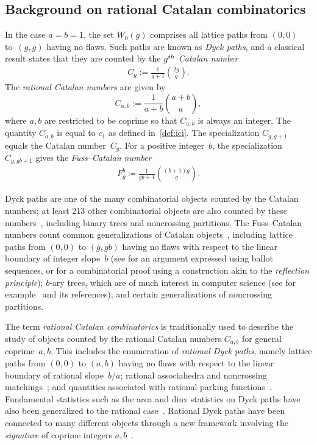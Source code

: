\documentclass[11pt]{article}
\theoremstyle{definition} %
\numberwithin{equation}{section}
\begin{document}
\subsection{Background on rational Catalan combinatorics}
\label{sec:ratCat}

In the case $a=b=1$, the set $W_0(g)$ comprises all lattice paths from $(0,0)$ to~$(g,g)$ having no flaws. Such paths are known as \textit{Dyck paths}, and a classical result states that they are counted by the $g^{\rm th}$ \textit{Catalan number}
\begin{align}\label{eqn:Catalan}
C_g := \frac{1}{g+1}\binom{2g}{g}.
\end{align}
The \textit{rational Catalan numbers} \cite{rational_assoc-arm} are given by 
\begin{equation}
\label{eqn:rationalCatalan}
C_{a,b} := \frac{1}{a+b}\binom{a+b}{a},
\end{equation}
where $a,b$ are restricted to be coprime so that $C_{a,b}$ is always an integer. The quantity $C_{a,b}$ is equal to $c_1$ as defined in~\eqref{def:ici}. 
The specialization $C_{g,g+1}$ equals the Catalan number~$C_g$.
For a positive integer~$b$, the specialization $C_{g,gb+1}$ gives the 
\textit{Fuss--Catalan number}
\begin{align}
\label{eqn:fuss_catalan}
F_g^b \coloneq\frac{1}{gb+1}\binom{(b+1)g}{g}.    
\end{align}

Dyck paths are one of the many combinatorial objects counted by the Catalan numbers; 
at least 213 other combinatorial objects are also counted by these numbers~\cite{stanley-cat}, including binary trees and noncrossing partitions. 
The Fuss--Catalan numbers count common generalizations of Catalan objects~\cite{fuss}, including lattice paths from $(0,0)$ to $(g,gb)$ having no flaws with respect to the linear boundary of integer slope~$b$ (see \cite{cycle_lemma_og} for an argument expressed using  ballot sequences, or \cite{goulden_serrano} for a combinatorial proof using a construction akin to the \textit{reflection principle});
$b$-ary trees, which are of much interest in computer science (see for example~\cite{banderier} and its references); and certain generalizations of noncrossing partitions. 

The term \textit{rational Catalan combinatorics} is traditionally used to describe the study of objects counted by the rational Catalan numbers $C_{a,b}$ for general coprime~$a,b$. 
This includes the enumeration of \textit{rational Dyck paths}, namely lattice paths from $(0,0)$ to $(a,b)$ having no flaws with respect to the linear boundary of rational slope~$b/a$; 
rational associahedra and noncrossing matchings~\cite{rational_assoc-arm}; and quantities associated with rational parking functions~\cite{rat-armstrong}.  Fundamental statistics such as the area and dinv statistics on Dyck paths have also been generalized to the rational case~\cite{rat-vazirani}.  
Rational Dyck paths have been connected to many different objects through a new framework involving the \textit{signature} of coprime integers $a,b$~\cite{sig-ceb}.
\end{document}
